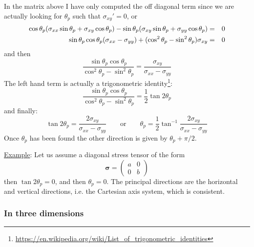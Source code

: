 In the matrix above I have only computed the off diagonal term since 
we are actually looking for $\theta_p$ such that $\sigma_{xy}'=0$, or
\begin{eqnarray}
\cos\theta_p(\sigma_{xx} \sin\theta_p + \sigma_{xy} \cos\theta_p )-
\sin\theta_p(\sigma_{xy} \sin\theta_p + \sigma_{yy} \cos\theta_p ) &=& 0 \nonumber\\
\sin\theta_p \cos\theta_p (\sigma_{xx}-\sigma_{yy}) + ( \cos^2\theta_p -\sin^2\theta_p )\sigma_{xy} &=& 0 \nonumber 
\end{eqnarray}
and then 
\[
\frac{ \sin\theta_p \cos\theta_p}{ \cos^2\theta_p -\sin^2\theta_p }
= \frac{\sigma_{xy}}{ \sigma_{xx}-\sigma_{yy} }
\]
The left hand term is actually a trigonometric 
identity\footnote{\url{https://en.wikipedia.org/wiki/List_of_trigonometric_identities}}:
\[
\frac{ \sin\theta_p \cos\theta_p}{ \cos^2\theta_p -\sin^2\theta_p } = \frac{1}{2} \tan 2\theta_p
\]
and finally:
\[
\tan 2\theta_p = \frac{ 2\sigma_{xy}}{ \sigma_{xx}-\sigma_{yy} }
\qquad
\text{or}
\qquad
\boxed{
\theta_p = \frac{1}{2} \tan^{-1} \frac{ 2\sigma_{xy}}{ \sigma_{xx}-\sigma_{yy} }
}
\]
Once $\theta_p$ has been found the other direction is given by $\theta_p +\pi/2$.

\vspace{.5cm}

\noindent \underline{Example}: Let us assume a diagonal stress tensor of the form 
\[
{\bm \sigma} = 
\left(
\begin{array}{cc}
a & 0 \\
0 & b
\end{array}
\right)
\]
then $\tan 2\theta_p = 0$, and then $\theta_p=0$. The principal directions are the horizontal and 
vertical directions, i.e. the Cartesian axis system, which is consistent.

\subsubsection{In three dimensions}

